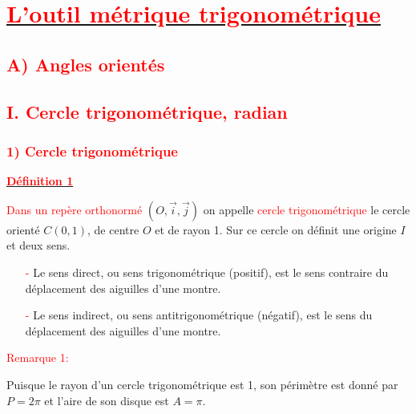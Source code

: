 \documentclass[a4paper,12pt]{article}
\begin{document}
\section*{\underline{\textbf{\textcolor{red}{L'outil métrique trigonométrique}}}}

\subsection*{\textcolor{red}{A) Angles orientés}}

\subsection*{\textcolor{red}{I. Cercle trigonométrique, radian}}

\subsubsection*{\textcolor{red}{1) Cercle trigonométrique}}

\underline{\textbf{\textcolor{red}{Définition 1}}}

\textcolor{red}{Dans un repère orthonormé} \( (O, \vec{i}, \vec{j}) \) on appelle \textcolor{red}{cercle trigonométrique} le cercle orienté \( C(0,1) \), de centre \( O \) et de rayon 1. Sur ce cercle on définit une origine \( I \) et deux sens.


    \begin{itemize}
        \item[\textcolor{red}{-}] Le sens direct, ou sens trigonométrique (positif), est le sens contraire du déplacement des aiguilles d'une montre.
        \item[\textcolor{red}{-}] Le sens indirect, ou sens antitrigonométrique (négatif), est le sens du déplacement des aiguilles d'une montre.
    \end{itemize}

\textcolor{red}{Remarque 1:} 

Puisque le rayon d'un cercle trigonométrique est 1, son périmètre est donné par \( P = 2\pi \) et l'aire de son disque est \( A = \pi \).
\end{document}
